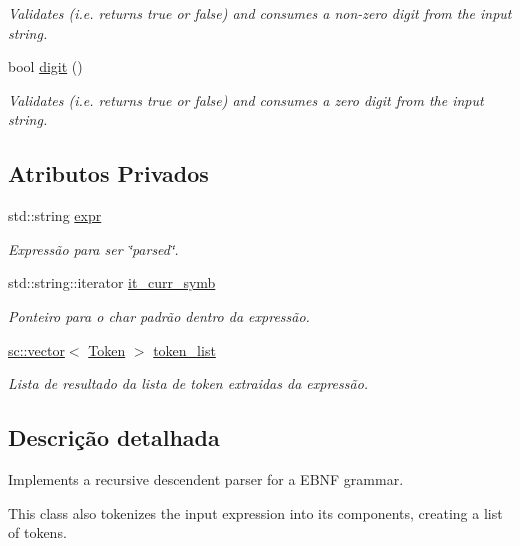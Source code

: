 \begin{DoxyCompactItemize}
\begin{DoxyCompactList}\small\item\em Validates (i.\+e. returns true or false) and consumes a non-\/zero digit from the input string. \end{DoxyCompactList}\item 
bool \hyperlink{classParser_ad9b268411777d28893f547653ece2206}{digit} ()
\begin{DoxyCompactList}\small\item\em Validates (i.\+e. returns true or false) and consumes a zero digit from the input string. \end{DoxyCompactList}\end{DoxyCompactItemize}
\subsection*{Atributos Privados}
\begin{DoxyCompactItemize}
\item 
std\+::string \hyperlink{classParser_a6429f38abf0207bc14d64bacc399b3f9}{expr}
\begin{DoxyCompactList}\small\item\em Expressão para ser \char`\"{}parsed\char`\"{}. \end{DoxyCompactList}\item 
std\+::string\+::iterator \hyperlink{classParser_a7036e94a1d0b3973d126a2023a91b7ec}{it\+\_\+curr\+\_\+symb}
\begin{DoxyCompactList}\small\item\em Ponteiro para o char padrão dentro da expressão. \end{DoxyCompactList}\item 
\hyperlink{classsc_1_1vector}{sc\+::vector}$<$ \hyperlink{structToken}{Token} $>$ \hyperlink{classParser_a87c81225df0bfa24bcd321bcbdd7af26}{token\+\_\+list}
\begin{DoxyCompactList}\small\item\em Lista de resultado da lista de token extraidas da expressão. \end{DoxyCompactList}\end{DoxyCompactItemize}


\subsection{Descrição detalhada}
Implements a recursive descendent parser for a E\+B\+NF grammar.

This class also tokenizes the input expression into its components, creating a list of tokens.

